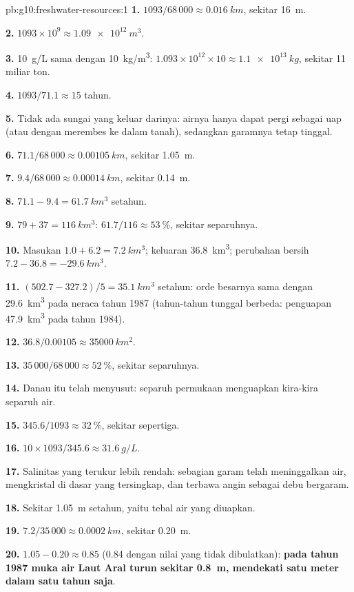 \begin{solution}{pb:g10:freshwater-resources:1}
\textbf{1.} $1093/68\,000 \approx \qty{0.016}{km}$, sekitar \qty{16}{m}.

\textbf{2.} $1093 \times 10^9 \approx \qty{1.09e12}{m^3}$.

\textbf{3.} \qty{10}{g/L} sama dengan \qty{10}{kg/m^3}: $1.093 \times 10^{12} \times 10
\approx \qty{1.1e13}{kg}$, sekitar \num{11} miliar ton.

\textbf{4.} $1093/71.1 \approx 15$ tahun.

\textbf{5.} Tidak ada sungai yang keluar darinya: airnya hanya dapat pergi
sebagai uap (atau dengan merembes ke dalam tanah), sedangkan garamnya tetap
tinggal.

\textbf{6.} $71.1/68\,000 \approx \qty{0.00105}{km}$, sekitar \qty{1.05}{m}.

\textbf{7.} $9.4/68\,000 \approx \qty{0.00014}{km}$, sekitar \qty{0.14}{m}.

\textbf{8.} $71.1 - 9.4 = \qty{61.7}{km^3}$ setahun.

\textbf{9.} $79 + 37 = \qty{116}{km^3}$: $61.7/116 \approx \qty{53}{\percent}$,
sekitar separuhnya.

\textbf{10.} Masukan $1.0 + 6.2 = \qty{7.2}{km^3}$; keluaran \qty{36.8}{km^3};
perubahan bersih $7.2 - 36.8 = \qty{-29.6}{km^3}$.

\textbf{11.} $(502.7 - 327.2)/5 = \qty{35.1}{km^3}$ setahun: orde besarnya sama
dengan \qty{29.6}{km^3} pada neraca tahun 1987 (tahun-tahun tunggal berbeda:
penguapan \qty{47.9}{km^3} pada tahun 1984).

\textbf{12.} $36.8/0.00105 \approx \qty{35000}{km^2}$.

\textbf{13.} $35\,000/68\,000 \approx \qty{52}{\percent}$, sekitar separuhnya.

\textbf{14.} Danau itu telah menyusut: separuh permukaan menguapkan kira-kira
separuh air.

\textbf{15.} $345.6/1093 \approx \qty{32}{\percent}$, sekitar sepertiga.

\textbf{16.} $10 \times 1093/345.6 \approx \qty{31.6}{g/L}$.

\textbf{17.} Salinitas yang terukur lebih rendah: sebagian garam telah
meninggalkan air, mengkristal di dasar yang tersingkap, dan terbawa angin
sebagai debu bergaram.

\textbf{18.} Sekitar \qty{1.05}{m} setahun, yaitu tebal air yang diuapkan.

\textbf{19.} $7.2/35\,000 \approx \qty{0.0002}{km}$, sekitar \qty{0.20}{m}.

\textbf{20.} $1.05 - 0.20 \approx 0.85$ (\num{0.84} dengan nilai yang tidak
dibulatkan): \textbf{pada tahun 1987 muka air Laut Aral turun sekitar
\qty{0.8}{m}, mendekati satu meter dalam satu tahun saja}.
\end{solution}
